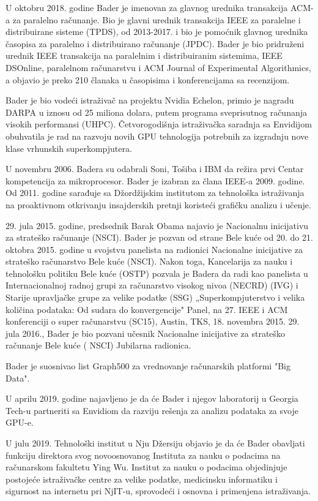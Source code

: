 \documentclass[a4paper]{article}
\begin{document}
{U oktobru 2018. godine Bader je imenovan za glavnog urednika transakcija ACM-a za paralelno računanje. Bio je glavni urednik transakcija IEEE za paralelne i distribuirane sisteme (TPDS), od 2013-2017. i bio je pomoćnik glavnog urednika časopisa za paralelno i distribuirano računanje (JPDC). Bader je bio pridruženi urednik IEEE transakcija na paralelnim i distribuiranim sistemima, IEEE DSOnline, paralelnom računarstvu i ACM Journal of Experimental Algorithmics, a objavio je preko 210 članaka u časopisima i konferencijama sa recenzijom.

Bader je bio vodeći istraživač na projektu Nvidia Echelon, primio je nagradu DARPA u iznosu od 25 miliona dolara, putem programa sveprisutnog računanja visokih performansi (UHPC). Četvorogodišnja istraživačka saradnja sa Envidijom obuhvatila je rad na razvoju novih GPU tehnologija potrebnih za izgradnju nove klase vrhunskih superkompjutera.

U novembru 2006. Badera su odabrali Soni, Tošiba i IBM da režira prvi Centar kompetencija za mikroprocesor. Bader je izabran za člana IEEE-a 2009. godine. Od 2011. godine sarađuje sa Džordžijskim institutom za tehnološka istraživanja na proaktivnom otkrivanju insajderskih pretnji koristeći grafičku analizu i učenje.

29. jula 2015. godine, predsednik Barak Obama najavio je Nacionalnu inicijativu za strateško računanje (NSCI). Bader je pozvan od strane Bele kuće od 20. do 21. oktobra 2015. godine u svojstvu panelista na radionici Nacionalne inicijative za strateško računarstvo Bele kuće (NSCI). Nakon toga, Kancelarija za nauku i tehnološku politiku Bele kuće (OSTP) pozvala je Badera da radi kao panelista u Internacionalnoj radnoj grupi za računarstvo visokog nivoa (NECRD) (IVG) i Starije upravljačke grupe za velike podatke (SSG) „Superkompjuterstvo i velika količina podataka: Od sudara do konvergencije" Panel, na 27. IEEE i ACM konferenciji o super računarstvu (SC15), Austin, TKS, 18. novembra 2015. 29. jula 2016., Bader je bio pozvani učesnik Nacionalne inicijative za strateško računanje Bele kuće ( NSCI) Jubilarna radionica.

Bader je suosnivao list Graph500 za vrednovanje računarskih platformi "Big Data".

U aprilu 2019. godine najavljeno je da će Bader i njegov laboratorij u Georgia Tech-u partneriti sa Envidiom da razviju rešenja za analizu podataka za svoje GPU-e.

U julu 2019. Tehnološki institut u Nju Džersiju objavio je da će Bader obavljati funkciju direktora svog novoosnovanog Instituta za nauku o podacima na računarskom fakultetu Ying Wu. Institut za nauku o podacima objedinjuje postojeće istraživačke centre za velike podatke, medicinsku informatiku i sigurnost na internetu pri NjIT-u, sprovodeći i osnovna i primenjena istraživanja.

}
\end{document}
